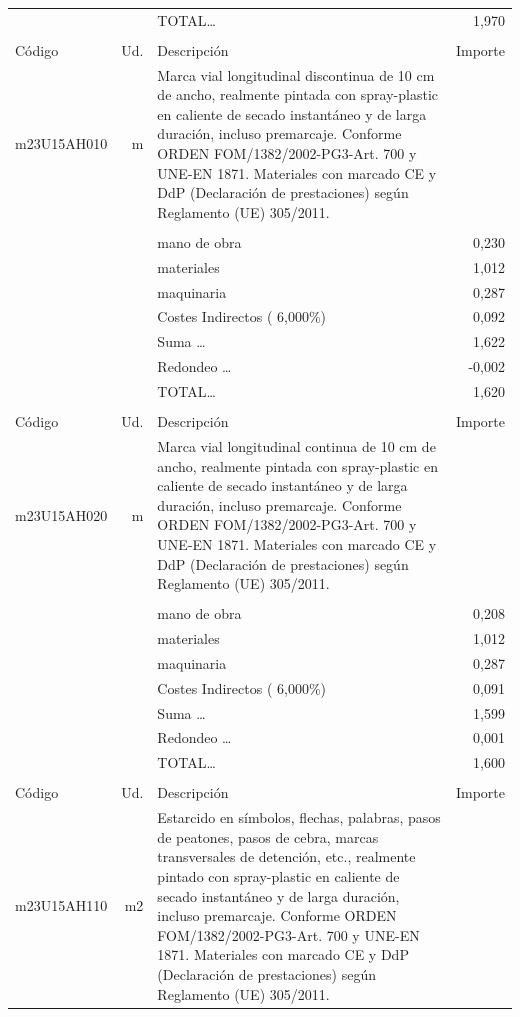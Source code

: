 \begin{supertabular}{l r p{60mm} r}
&&TOTAL\ldots&     1,970\\%
&&&\\%
Código&Ud.&Descripción&Importe\\%
\hline%
m23U15AH010&m&Marca vial longitudinal discontinua de 10 cm de ancho, realmente pintada con spray{-}plastic en caliente de secado instantáneo y de larga duración, incluso premarcaje. Conforme ORDEN FOM/1382/2002{-}PG3{-}Art. 700 y UNE{-}EN 1871. Materiales con marcado CE y DdP (Declaración de prestaciones) según Reglamento (UE) 305/2011.&\\%
&&&\\%
&&mano de obra&     0,230\\%
&&materiales&     1,012\\%
&&maquinaria&     0,287\\%
&&Costes Indirectos (     6,000\%)&     0,092\\%
&&Suma \ldots&     1,622\\%
&&Redondeo \ldots&    {-}0,002\\%
%
&&TOTAL\ldots&     1,620\\%
&&&\\%
Código&Ud.&Descripción&Importe\\%
\hline%
m23U15AH020&m&Marca vial longitudinal continua de 10 cm de ancho, realmente pintada con spray{-}plastic en caliente de secado instantáneo y de larga duración, incluso premarcaje. Conforme ORDEN FOM/1382/2002{-}PG3{-}Art. 700 y UNE{-}EN 1871. Materiales con marcado CE y DdP (Declaración de prestaciones) según Reglamento (UE) 305/2011.&\\%
&&&\\%
&&mano de obra&     0,208\\%
&&materiales&     1,012\\%
&&maquinaria&     0,287\\%
&&Costes Indirectos (     6,000\%)&     0,091\\%
&&Suma \ldots&     1,599\\%
&&Redondeo \ldots&     0,001\\%
%
&&TOTAL\ldots&     1,600\\%
&&&\\%
Código&Ud.&Descripción&Importe\\%
\hline%
m23U15AH110&m2&Estarcido en símbolos, flechas, palabras, pasos de peatones, pasos de cebra, marcas transversales de detención, etc., realmente pintado con spray{-}plastic en caliente de secado instantáneo y de larga duración, incluso premarcaje. Conforme ORDEN FOM/1382/2002{-}PG3{-}Art. 700 y UNE{-}EN 1871. Materiales con marcado CE y DdP (Declaración de prestaciones) según Reglamento (UE) 305/2011.&\\%

\end{supertabular}
